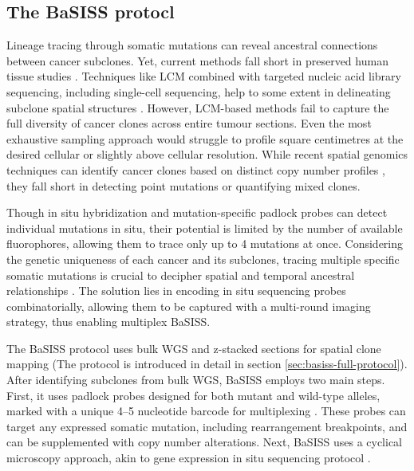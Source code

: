 \subsection{The \ac{BaSISS} protocl}
\label{sec:basiss-intro}
Lineage tracing through somatic mutations can reveal ancestral connections between cancer subclones. Yet, current methods fall short in preserved human tissue studies \parencite{Yates2015-xk,Jamal-Hanjani2017-uv,Jones2008-sd,Shah2009-xz,Casasent2018-gx,Tarabichi2021-xx}. Techniques like \acf{LCM} combined with targeted nucleic acid library sequencing, including single-cell sequencing, help to some extent in delineating subclone spatial structures \parencite{Shen2000-xj,Casasent2018-gx}. However, \ac{LCM}-based methods fail to capture the full diversity of cancer clones across entire tumour sections. Even the most exhaustive sampling approach would struggle to profile square centimetres at the desired cellular or slightly above cellular resolution. While recent spatial genomics techniques can identify cancer clones based on distinct copy number profiles \parencite{Zhao2022-xd,Erickson2022-zh}, they fall short in detecting point mutations or quantifying mixed clones.

Though in situ hybridization \parencite{Janiszewska2015-kb} and mutation-specific padlock probes \parencite{Larsson2010-bp,Grundberg2013-te,Ke2013-ux,Baker2017-dv} can detect individual mutations in situ, their potential is limited by the number of available fluorophores, allowing them to trace only up to 4 mutations at once. Considering the genetic uniqueness of each cancer and its subclones, tracing multiple specific somatic mutations is crucial to decipher spatial and temporal ancestral relationships \parencite{Nik-Zainal2012-zz}. The solution lies in encoding in situ sequencing probes combinatorially, allowing them to be captured with a multi-round imaging strategy, thus enabling multiplex \acf{BaSISS}.

The \ac{BaSISS} protocol uses bulk \ac{WGS} and z-stacked sections for spatial clone mapping (The protocol is introduced in detail in section \cref{sec:basiss-full-protocol}). After identifying subclones from bulk WGS, \ac{BaSISS} employs two main steps. First, it uses padlock probes designed for both mutant and wild-type alleles, marked with a unique 4–5 nucleotide barcode for multiplexing \parencite{Ke2013-ux}. These probes can target any expressed somatic mutation, including rearrangement breakpoints, and can be supplemented with copy number alterations. Next, \ac{BaSISS}  uses a cyclical microscopy approach, akin to gene expression in situ sequencing protocol \parencite{Ke2013-ux,Svedlund2019-xb}.

